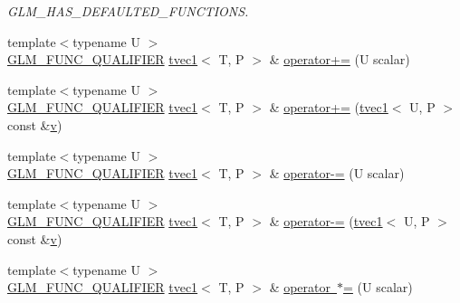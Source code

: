 \begin{DoxyCompactItemize}
\begin{DoxyCompactList}\small\item\em G\+L\+M\+\_\+\+H\+A\+S\+\_\+\+D\+E\+F\+A\+U\+L\+T\+E\+D\+\_\+\+F\+U\+N\+C\+T\+I\+O\+NS. \end{DoxyCompactList}\item 
{\footnotesize template$<$typename U $>$ }\\\mbox{\hyperlink{setup_8hpp_a33fdea6f91c5f834105f7415e2a64407}{G\+L\+M\+\_\+\+F\+U\+N\+C\+\_\+\+Q\+U\+A\+L\+I\+F\+I\+ER}} \mbox{\hyperlink{structglm_1_1tvec1}{tvec1}}$<$ T, P $>$ \& \mbox{\hyperlink{structglm_1_1tvec1_a793ef2e8275fca7c1d9daf47557fa145}{operator+=}} (U scalar)
\item 
{\footnotesize template$<$typename U $>$ }\\\mbox{\hyperlink{setup_8hpp_a33fdea6f91c5f834105f7415e2a64407}{G\+L\+M\+\_\+\+F\+U\+N\+C\+\_\+\+Q\+U\+A\+L\+I\+F\+I\+ER}} \mbox{\hyperlink{structglm_1_1tvec1}{tvec1}}$<$ T, P $>$ \& \mbox{\hyperlink{structglm_1_1tvec1_ac579b8e14a7aa466cb0185e0e5fb7b3d}{operator+=}} (\mbox{\hyperlink{structglm_1_1tvec1}{tvec1}}$<$ U, P $>$ const \&\mbox{\hyperlink{glad_8h_a14cfbe2fc2234f5504618905b69d1e06}{v}})
\item 
{\footnotesize template$<$typename U $>$ }\\\mbox{\hyperlink{setup_8hpp_a33fdea6f91c5f834105f7415e2a64407}{G\+L\+M\+\_\+\+F\+U\+N\+C\+\_\+\+Q\+U\+A\+L\+I\+F\+I\+ER}} \mbox{\hyperlink{structglm_1_1tvec1}{tvec1}}$<$ T, P $>$ \& \mbox{\hyperlink{structglm_1_1tvec1_af8bf716ff4244ed3e83768afe01f04eb}{operator-\/=}} (U scalar)
\item 
{\footnotesize template$<$typename U $>$ }\\\mbox{\hyperlink{setup_8hpp_a33fdea6f91c5f834105f7415e2a64407}{G\+L\+M\+\_\+\+F\+U\+N\+C\+\_\+\+Q\+U\+A\+L\+I\+F\+I\+ER}} \mbox{\hyperlink{structglm_1_1tvec1}{tvec1}}$<$ T, P $>$ \& \mbox{\hyperlink{structglm_1_1tvec1_adda6b97039322228b22bae46dc2412f2}{operator-\/=}} (\mbox{\hyperlink{structglm_1_1tvec1}{tvec1}}$<$ U, P $>$ const \&\mbox{\hyperlink{glad_8h_a14cfbe2fc2234f5504618905b69d1e06}{v}})
\item 
{\footnotesize template$<$typename U $>$ }\\\mbox{\hyperlink{setup_8hpp_a33fdea6f91c5f834105f7415e2a64407}{G\+L\+M\+\_\+\+F\+U\+N\+C\+\_\+\+Q\+U\+A\+L\+I\+F\+I\+ER}} \mbox{\hyperlink{structglm_1_1tvec1}{tvec1}}$<$ T, P $>$ \& \mbox{\hyperlink{structglm_1_1tvec1_a10364a60b448320a9349aaff5b47b1d5}{operator $\ast$=}} (U scalar)
\item 

\end{DoxyCompactItemize}
